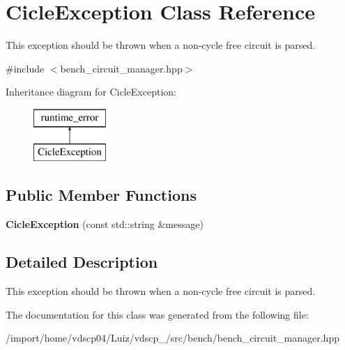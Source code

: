 \section{Cicle\+Exception Class Reference}
\label{classCicleException}


This exception should be thrown when a non-\/cycle free circuit is parsed.  




{\ttfamily \#include $<$bench\+\_\+circuit\+\_\+manager.\+hpp$>$}

Inheritance diagram for Cicle\+Exception\+:\begin{figure}[H]
\begin{center}
\leavevmode
\includegraphics[height=2.000000cm]{classCicleException}
\end{center}
\end{figure}
\subsection*{Public Member Functions}
\begin{DoxyCompactItemize}
\item 
{\bfseries Cicle\+Exception} (const std\+::string \&message)\label{classCicleException_a51147b615bdb26f9301f0a79bba60c28}

\end{DoxyCompactItemize}


\subsection{Detailed Description}
This exception should be thrown when a non-\/cycle free circuit is parsed. 

The documentation for this class was generated from the following file\+:\begin{DoxyCompactItemize}
\item 
/import/home/vdscp04/\+Luiz/vdscp\+\_/src/bench/bench\+\_\+circuit\+\_\+manager.\+hpp\end{DoxyCompactItemize}
